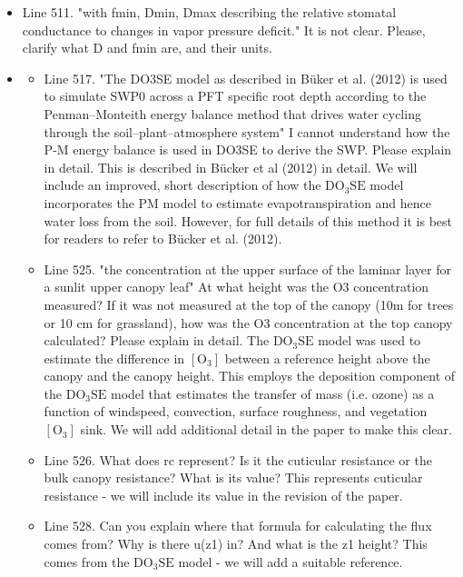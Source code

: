 \documentclass{scrartcl}
\begin{document}
\begin{itemize}
\item {\color{blue}Line 511. "with fmin, Dmin, Dmax describing the relative stomatal conductance to changes in vapor pressure deficit." It is not clear. Please, clarify what D and fmin are, and their units.}

\item {\color{blue}
\begin{itemize}
    \item Line 517. "The DO3SE model as described in Büker et al. (2012) is used to simulate SWP0 across a PFT specific root depth according to the Penman--Monteith energy balance method that drives water cycling through the soil--plant--atmosphere system" I cannot understand how the P-M energy balance is used in DO3SE to derive the SWP. Please explain in detail.
    {\color{black} This is described in Bücker et al (2012) in detail. We will include an improved, short description of how the $\mathrm{DO_3SE}$ model incorporates the PM model to estimate evapotranspiration and hence water loss from the soil. However, for full details of this method it is best for readers to refer to Bücker et al. (2012).}

    \item Line 525. "the concentration at the upper surface of the laminar layer for a sunlit upper canopy leaf" At what height was the O3 concentration measured? If it was not measured at the top of the canopy (10m for trees or 10 cm for grassland), how was the O3 concentration at the top canopy calculated? Please explain in detail.
    {\color{black} The $\mathrm{DO_3SE}$ model was used to estimate the difference in $[\mathrm{O_3}]$} between a reference height above the canopy and the canopy height. This employs the deposition component of the $\mathrm{DO_3SE}$ model that estimates the transfer of mass (i.e. ozone) as a function of windspeed, convection, surface roughness, and vegetation $[\mathrm{O_3}]$ sink. We will add additional detail in the paper to make this clear.

    \item Line 526. What does rc represent? Is it the cuticular resistance or the bulk canopy resistance? What is its value?
    {\color{black}This represents cuticular resistance - we will include its value in the revision of the paper.}

    \item Line 528. Can you explain where that formula for calculating the flux comes from? Why is there u(z1) in? And what is the z1 height?
    {\color{black}This comes from the $\mathrm{DO_3SE}$ model - we will add a suitable reference.}


\end{itemize}}
\end{itemize}
\end{document}
